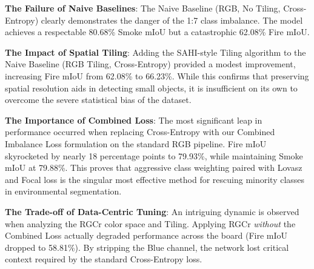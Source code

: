 \documentclass[conference]{IEEEtran}
\begin{document}
\begin{table}[htbp]
\caption{Ablation Studies on the FIgLib Test Set (PIDNet-M)}
\centering
{}
\label{tab:ablation}
\end{table}

\textbf{The Failure of Naive Baselines}: The Naive Baseline (RGB, No Tiling, Cross-Entropy) clearly demonstrates the danger of the 1:7 class imbalance. The model achieves a respectable 80.68\% Smoke mIoU but a catastrophic 62.08\% Fire mIoU. 

\textbf{The Impact of Spatial Tiling}: Adding the SAHI-style Tiling algorithm to the Naive Baseline (RGB Tiling, Cross-Entropy) provided a modest improvement, increasing Fire mIoU from 62.08\% to 66.23\%. While this confirms that preserving spatial resolution aids in detecting small objects, it is insufficient on its own to overcome the severe statistical bias of the dataset.

\textbf{The Importance of Combined Loss}: The most significant leap in performance occurred when replacing Cross-Entropy with our Combined Imbalance Loss formulation on the standard RGB pipeline. Fire mIoU skyrocketed by nearly 18 percentage points to 79.93\%, while maintaining Smoke mIoU at 79.88\%. This proves that aggressive class weighting paired with Lovasz and Focal loss is the singular most effective method for rescuing minority classes in environmental segmentation.

\textbf{The Trade-off of Data-Centric Tuning}: An intriguing dynamic is observed when analyzing the RGCr color space and Tiling. Applying RGCr \textit{without} the Combined Loss actually degraded performance across the board (Fire mIoU dropped to 58.81\%). By stripping the Blue channel, the network lost critical context required by the standard Cross-Entropy loss. 
\end{document}
